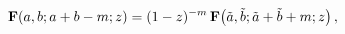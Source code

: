 \[\mathop{\mathbf{F}\/}\nolimits\!\left(a,b;a+b-m;z\right)=(1-z)^{-m}\mathop{%
\mathbf{F}\/}\nolimits\!\left(\tilde{a},\tilde{b};\tilde{a}+\tilde{b}+m;z%
\right),\]